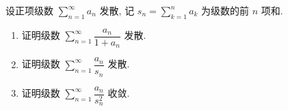 \begin{question}[points = 10]
  设正项级数 $\sum\limits_{n=1}^{\infty} a_n$ 发散, 记 $s_n = \sum\limits_{k=1}^n a_k$ 为级数的前 $n$ 项和.
  \begin{enumerate}
    \item 证明级数 $\sum\limits_{n=1}^{\infty} \dfrac{a_n}{1 + a_n}$ 发散.
    \item 证明级数 $\sum\limits_{n=1}^{\infty} \dfrac{a_n}{s_n}$ 发散.
    \item 证明级数 $\sum\limits_{n=1}^{\infty} \dfrac{a_n}{s_n^2}$ 收敛.
  \end{enumerate}

\end{question}

